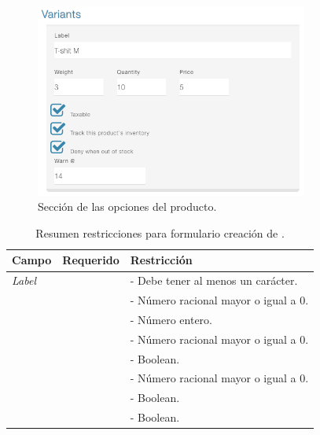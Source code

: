 		\begin{figure}[H]
			\centering
			\includegraphics[width=0.8\textwidth]{figuras/productos/details/write/product_variant.png}

			\caption{Sección de las opciones del producto.}
			\label{figure:productos:detail:product_variant}
		\end{figure}

		\begin{table}[H] 
		    \centering
			\begin{tabular}{ |l|c||l| }
				\hline Campo & Requerido & Restricción \\ \hline
				\multirow{1}{*}{\textit{Label}}		&  \multirow{1}{*}{\checkmark} 	& - Debe tener al menos un carácter. \\ \hline
				\multirow{1}{*}{\textit{\WeightForm}}	&  \multirow{1}{*}{\checkmark} 	& - Número racional mayor o igual a 0. \\ \hline
				\multirow{1}{*}{\quantityForm}	&  \multirow{1}{*}{\checkmark} 	& - Número entero. \\ \hline
				\multirow{1}{*}{\priceForm}		&  \multirow{1}{*}{\checkmark} 	& - Número racional mayor o igual a 0. \\ \hline
				\multirow{1}{*}{\denyForm}		&  \multirow{1}{*}{\checkmark} 	& - Boolean. \\ \hline
				\multirow{1}{*}{\warnForm}		&  \multirow{1}{*}{} 			& - Número racional mayor o igual a 0. \\ \hline
				\multirow{1}{*}{\taxableForm}	&  \multirow{1}{*}{\checkmark} 	& - Boolean. \\ \hline
				\multirow{1}{*}{\trackingForm}	&  \multirow{1}{*}{\checkmark} 	& - Boolean. \\ \hline
			\end{tabular}
		 	\caption{Resumen restricciones para formulario creación de \optionsForm.}
		    \label{tab:solution:products:create:form:product:generic:options}
		\end{table}

